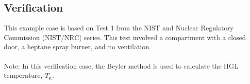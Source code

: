 \clearpage


\subsection*{Verification}

This example case is based on Test 1 from the NIST and Nuclear Regulatory Commission (NIST/NRC) series. This test involved a compartment with a closed door, a heptane spray burner, and no ventilation.
\\ \\
\noindent Note: In this verification case, the Beyler method is used to calculate the HGL temperature, $T\sb{g}$.


